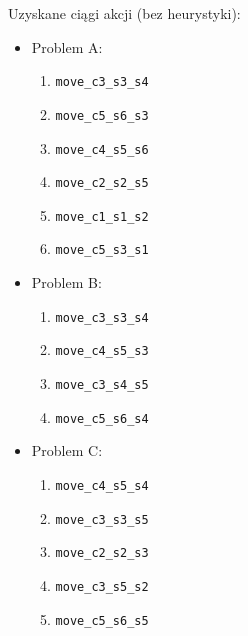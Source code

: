 \documentclass[12pt,a4paper]{article}
\begin{document}
\begin{table}[h]
\centering
{}
\caption{Wyniki wyszukiwania bez heurystyki.}
\end{table}

Uzyskane ciągi akcji (bez heurystyki):
\begin{itemize}
    \item Problem A:
    \begin{enumerate}
        \item \texttt{move\_c3\_s3\_s4}
        \item \texttt{move\_c5\_s6\_s3}
        \item \texttt{move\_c4\_s5\_s6}
        \item \texttt{move\_c2\_s2\_s5}
        \item \texttt{move\_c1\_s1\_s2}
        \item \texttt{move\_c5\_s3\_s1}
    \end{enumerate}
    \item Problem B:
    \begin{enumerate}
        \item \texttt{move\_c3\_s3\_s4}
        \item \texttt{move\_c4\_s5\_s3}
        \item \texttt{move\_c3\_s4\_s5}
        \item \texttt{move\_c5\_s6\_s4}
    \end{enumerate}
    \item Problem C:
    \begin{enumerate}
        \item \texttt{move\_c4\_s5\_s4}
        \item \texttt{move\_c3\_s3\_s5}
        \item \texttt{move\_c2\_s2\_s3}
        \item \texttt{move\_c3\_s5\_s2}
        \item \texttt{move\_c5\_s6\_s5}
    \end{enumerate}
\end{itemize}
\end{document}
